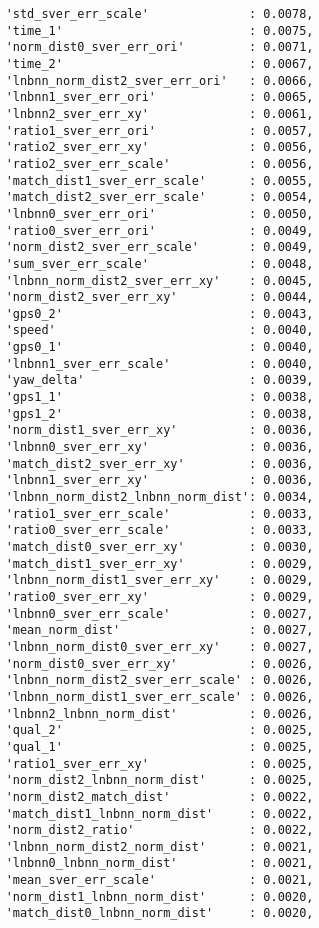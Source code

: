 \begin{verbatim}
    'std_sver_err_scale'              : 0.0078,
    'time_1'                          : 0.0075,
    'norm_dist0_sver_err_ori'         : 0.0071,
    'time_2'                          : 0.0067,
    'lnbnn_norm_dist2_sver_err_ori'   : 0.0066,
    'lnbnn1_sver_err_ori'             : 0.0065,
    'lnbnn2_sver_err_xy'              : 0.0061,
    'ratio1_sver_err_ori'             : 0.0057,
    'ratio2_sver_err_xy'              : 0.0056,
    'ratio2_sver_err_scale'           : 0.0056,
    'match_dist1_sver_err_scale'      : 0.0055,
    'match_dist2_sver_err_scale'      : 0.0054,
    'lnbnn0_sver_err_ori'             : 0.0050,
    'ratio0_sver_err_ori'             : 0.0049,
    'norm_dist2_sver_err_scale'       : 0.0049,
    'sum_sver_err_scale'              : 0.0048,
    'lnbnn_norm_dist2_sver_err_xy'    : 0.0045,
    'norm_dist2_sver_err_xy'          : 0.0044,
    'gps0_2'                          : 0.0043,
    'speed'                           : 0.0040,
    'gps0_1'                          : 0.0040,
    'lnbnn1_sver_err_scale'           : 0.0040,
    'yaw_delta'                       : 0.0039,
    'gps1_1'                          : 0.0038,
    'gps1_2'                          : 0.0038,
    'norm_dist1_sver_err_xy'          : 0.0036,
    'lnbnn0_sver_err_xy'              : 0.0036,
    'match_dist2_sver_err_xy'         : 0.0036,
    'lnbnn1_sver_err_xy'              : 0.0036,
    'lnbnn_norm_dist2_lnbnn_norm_dist': 0.0034,
    'ratio1_sver_err_scale'           : 0.0033,
    'ratio0_sver_err_scale'           : 0.0033,
    'match_dist0_sver_err_xy'         : 0.0030,
    'match_dist1_sver_err_xy'         : 0.0029,
    'lnbnn_norm_dist1_sver_err_xy'    : 0.0029,
    'ratio0_sver_err_xy'              : 0.0029,
    'lnbnn0_sver_err_scale'           : 0.0027,
    'mean_norm_dist'                  : 0.0027,
    'lnbnn_norm_dist0_sver_err_xy'    : 0.0027,
    'norm_dist0_sver_err_xy'          : 0.0026,
    'lnbnn_norm_dist2_sver_err_scale' : 0.0026,
    'lnbnn_norm_dist1_sver_err_scale' : 0.0026,
    'lnbnn2_lnbnn_norm_dist'          : 0.0026,
    'qual_2'                          : 0.0025,
    'qual_1'                          : 0.0025,
    'ratio1_sver_err_xy'              : 0.0025,
    'norm_dist2_lnbnn_norm_dist'      : 0.0025,
    'norm_dist2_match_dist'           : 0.0022,
    'match_dist1_lnbnn_norm_dist'     : 0.0022,
    'norm_dist2_ratio'                : 0.0022,
    'lnbnn_norm_dist2_norm_dist'      : 0.0021,
    'lnbnn0_lnbnn_norm_dist'          : 0.0021,
    'mean_sver_err_scale'             : 0.0021,
    'norm_dist1_lnbnn_norm_dist'      : 0.0020,
    'match_dist0_lnbnn_norm_dist'     : 0.0020,

\end{verbatim}
